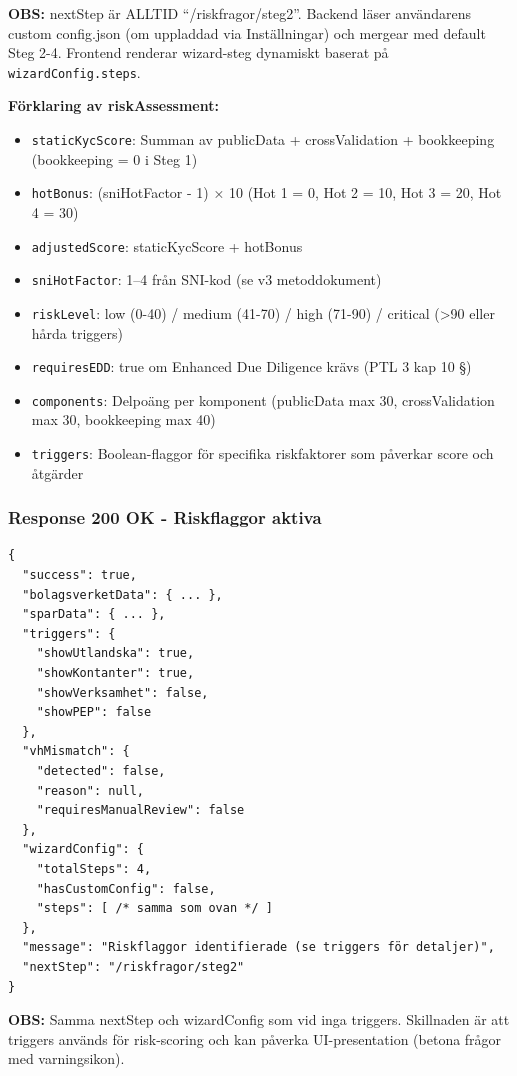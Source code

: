 \documentclass[12pt,a4paper]{article}
\begin{document}
\textbf{OBS:} nextStep är ALLTID \enquote{/riskfragor/steg2}. Backend läser användarens custom config.json (om uppladdad via Inställningar) och mergear med default Steg 2-4. Frontend renderar wizard-steg dynamiskt baserat på \texttt{wizardConfig.steps}.

\textbf{Förklaring av riskAssessment:}
\begin{itemize}[noitemsep]
  \item \texttt{staticKycScore}: Summan av publicData + crossValidation + bookkeeping (bookkeeping = 0 i Steg 1)
  \item \texttt{hotBonus}: (sniHotFactor - 1) × 10 (Hot 1 = 0, Hot 2 = 10, Hot 3 = 20, Hot 4 = 30)
  \item \texttt{adjustedScore}: staticKycScore + hotBonus
  \item \texttt{sniHotFactor}: 1–4 från SNI-kod (se v3 metoddokument)
  \item \texttt{riskLevel}: low (0-40) / medium (41-70) / high (71-90) / critical (>90 eller hårda triggers)
  \item \texttt{requiresEDD}: true om Enhanced Due Diligence krävs (PTL 3 kap 10 §)
  \item \texttt{components}: Delpoäng per komponent (publicData max 30, crossValidation max 30, bookkeeping max 40)
  \item \texttt{triggers}: Boolean-flaggor för specifika riskfaktorer som påverkar score och åtgärder
\end{itemize}

\subsubsection{Response 200 OK - Riskflaggor aktiva}

\begin{lstlisting}
{
  "success": true,
  "bolagsverketData": { ... },
  "sparData": { ... },
  "triggers": {
    "showUtlandska": true,
    "showKontanter": true,
    "showVerksamhet": false,
    "showPEP": false
  },
  "vhMismatch": {
    "detected": false,
    "reason": null,
    "requiresManualReview": false
  },
  "wizardConfig": {
    "totalSteps": 4,
    "hasCustomConfig": false,
    "steps": [ /* samma som ovan */ ]
  },
  "message": "Riskflaggor identifierade (se triggers för detaljer)",
  "nextStep": "/riskfragor/steg2"
}
\end{lstlisting}

\textbf{OBS:} Samma nextStep och wizardConfig som vid inga triggers. Skillnaden är att triggers används för risk-scoring och kan påverka UI-presentation (betona frågor med varningsikon).
\end{document}
